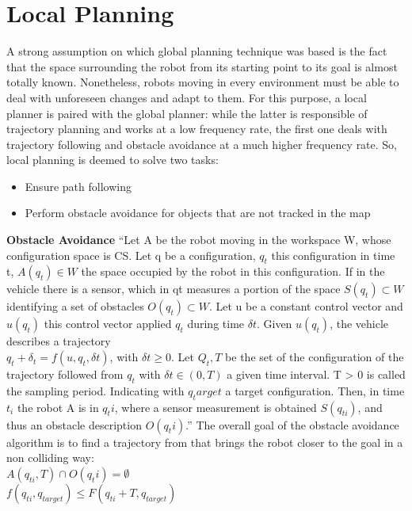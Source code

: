 \section{Local Planning}
A strong assumption on which global planning technique was based is the fact that the space surrounding the robot from its starting point to its goal is almost totally known. Nonetheless, robots moving in every environment must be able to deal with unforeseen changes and adapt to them. For this purpose, a local planner is paired with the global planner: while the latter is responsible of trajectory planning and  works at a low frequency rate, the first one deals with trajectory following and obstacle avoidance at a much higher frequency rate.
So, local planning is deemed to solve two tasks:
\begin{itemize}
    \item Ensure path following
    \item Perform obstacle avoidance for objects that are not tracked in the map
\end{itemize}
\textbf{Obstacle Avoidance}
“Let A be the robot moving in the workspace W, whose configuration space is CS. Let
q be a configuration, $q_{t}$ this configuration in time t, $A(q_{t}) \in W$ the space occupied by the robot in this configuration.
If in the vehicle there is a sensor, which in qt measures a portion of the space $S(q_{t}) \subset W$ identifying a set of obstacles $O(q_{t}) \subset W$. Let u be a constant control vector and $u(q_{t})$
this control vector applied $q_{t}$ during time $\delta t$. Given $u(q_{t})$, the vehicle describes a trajectory \\
$q_t + \delta_t = f(u, q_t, \delta t)$, with        $\delta t \geq 0$.
Let $Q_t,T$ be the set of the configuration of the trajectory followed from $q_t$ with $\delta t \in (0,T)$ a given time interval. T > 0 is called the sampling period. Indicating with $q_target$ a target configuration. Then, in time $t_i$ the robot A is in $q_ti$, where a sensor measurement is obtained $S(q_{ti})$, and thus an obstacle description $O(q_ti)$.” \citet{SicilianoKhatib2008}
The overall goal of the obstacle avoidance algorithm is to find a trajectory from that brings the robot closer to the goal in a non colliding way:\\
$A(q_{ti}, T) \cap O(q_ti) = \emptyset$ \\
$f(q_{ti}, q_{target}) \le F(q_{ti} + T, q_{target})$\\
